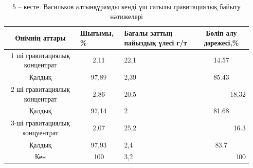 \begin{table}[H]
\caption*{5 -- кесте. Васильков алтынқұрамды кенді үш сатылы гравитациялық байыту нәтижелері}
\centering
\begin{tabular}{|c|c|p{}|c|}
\hline
Өнімнің аттары & \multicolumn{1}{l|}{Шығымы, \%} & \multicolumn{1}{p{0.2\textwidth}|}{Бағалы заттың пайыздық үлесі г/т} & Бөліп алу дәрежесі,\% \\ \hline
1 ші гравитациялық концентрат  & 2,11  & 22,1 & 14.57                      \\ \hline
Қалдық                         & 97,89 & 2,39 & 85.43                      \\ \hline
2 ші гравитациялық концентрат  & 2,86  & 20,5 & \multicolumn{1}{r|}{18,32} \\ \hline
Қалдық                         & 97,14 & 2    & 81.68                      \\ \hline
3-ші гравитациялық концуентрат & 2,07  & 25,2 & \multicolumn{1}{r|}{16.3}  \\ \hline
Қалдық                         & 97,93 & 2,4  & 83.7                       \\ \hline
Кен                            & 100   & 3,2  & \multicolumn{1}{r|}{100}   \\ \hline
\end{tabular}
\end{table}


